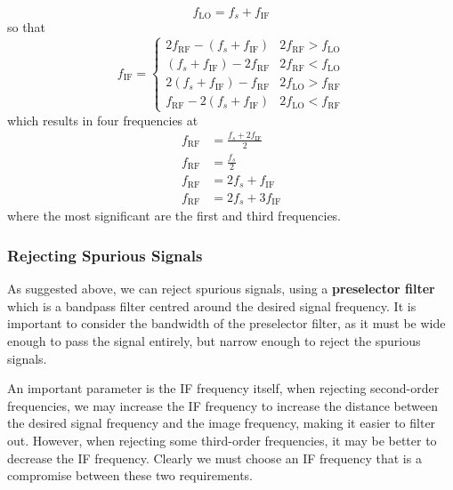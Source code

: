 \documentclass{article}
\begin{document}
\begin{itemize}
          \begin{equation*}
              f_{\mathrm{LO}} = f_s + f_{\mathrm{IF}}
          \end{equation*}
          so that
          \begin{equation*}
              f_{\mathrm{IF}} =
              \begin{cases}
                  2 f_{\mathrm{RF}} - \left( f_s + f_{\mathrm{IF}} \right) & 2 f_{\mathrm{RF}} > f_{\mathrm{LO}} \\
                  \left( f_s + f_{\mathrm{IF}} \right) - 2 f_{\mathrm{RF}} & 2 f_{\mathrm{RF}} < f_{\mathrm{LO}} \\
                  2 \left( f_s + f_{\mathrm{IF}} \right) - f_{\mathrm{RF}} & 2 f_{\mathrm{LO}} > f_{\mathrm{RF}} \\
                  f_{\mathrm{RF}} - 2 \left( f_s + f_{\mathrm{IF}} \right) & 2 f_{\mathrm{LO}} < f_{\mathrm{RF}}
              \end{cases}
          \end{equation*}
          which results in four frequencies at
          \begin{align*}
              f_{\mathrm{RF}} & = \frac{f_s + 2 f_{\mathrm{IF}}}{2} \\
              f_{\mathrm{RF}} & = \frac{f_s}{2}                     \\
              f_{\mathrm{RF}} & = 2 f_s + f_{\mathrm{IF}}           \\
              f_{\mathrm{RF}} & = 2 f_s + 3 f_{\mathrm{IF}}
          \end{align*}
          where the most significant are the first and third frequencies.
\end{itemize}
\subsubsection{Rejecting Spurious Signals}
As suggested above, we can reject spurious signals, using a
\textbf{preselector filter} which is a bandpass filter centred around
the desired signal frequency. It is important to consider the bandwidth
of the preselector filter, as it must be wide enough to pass the signal
entirely, but narrow enough to reject the spurious signals.

An important parameter is the IF frequency itself, when rejecting
second-order frequencies, we may increase the IF frequency to increase
the distance between the desired signal frequency and the image
frequency, making it easier to filter out. However, when rejecting some
third-order frequencies, it may be better to decrease the IF frequency.
Clearly we must choose an IF frequency that is a compromise between
these two requirements.
\end{document}

